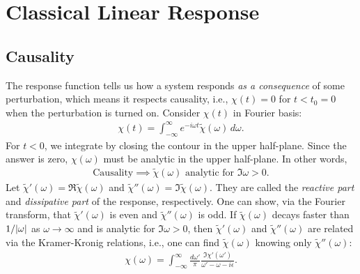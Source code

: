 \documentclass[prl,
twocolumn,
nofootinbib,
amsmath,amssymb,
aps]{revtex4-1}
\newcommand{\f}[2]{\frac{#1}{#2}}
\begin{document}
\section{Classical Linear Response}\label{sec:classical}

%
\subsection{Causality}
The response function tells us how a system responds \textit{as a consequence} of some perturbation, which means it respects causality, i.e., $\chi(t) = 0$ for $t < t_0 = 0$ when the perturbation is turned on. Consider $\chi(t)$ in Fourier basis:
\begin{align*}
\chi(t) = \int_{-\infty}^\infty  e^{-i\omega t } \tilde{\chi}(\omega) \,d\omega.
\end{align*}
For $t<0$, we integrate by closing the contour in the upper half-plane. Since the answer is zero, $\chi(\omega)$ must be analytic in the upper half-plane. In other words, 
\begin{align*}
\text{Causality} \implies \widetilde{\chi}(\omega) \text{ analytic for } \Im \omega  > 0.
\end{align*}
Let $\widetilde{\chi}'(\omega) = \Re \widetilde{\chi}(\omega)$ and $\widetilde{\chi}''(\omega) = \Im \widetilde{\chi}(\omega)$. They are called the \textit{reactive part} and \textit{dissipative part} of the response, respectively. One can show, via the Fourier transform, that $\widetilde{\chi}'(\omega)$ is even and $\widetilde{\chi}''(\omega)$ is odd. If $\widetilde{\chi}(\omega)$ decays faster than $1/\abs{\omega}$ as $\omega \to \infty$ and is analytic for $\Im \omega > 0$, then $\widetilde{\chi}'(\omega)$ and $\widetilde{\chi}''(\omega)$ are related via the Kramer-Kronig relations, i.e., one can find $\widetilde{\chi}(\omega)$ knowing only $\widetilde{\chi}''(\omega)$:
\begin{align*}
\chi(\omega) = \int_{-\infty}^\infty \f{d\omega'}{\pi} \f{\Im \chi'(\omega')}{\omega' - \omega - i\epsilon}.
\end{align*}
\end{document}
